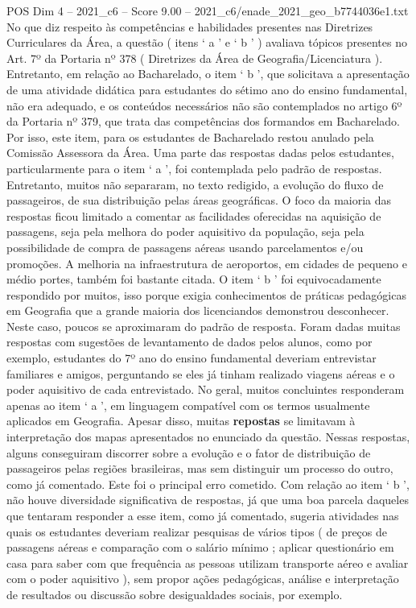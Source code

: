 \begin{textsample}{POS Dim 4 – 2021\_c6 – Score 9.00 – 2021\_c6/enade\_2021\_geo\_b7744036e1.txt}
No que diz respeito às competências e habilidades presentes nas Diretrizes Curriculares da Área, a questão ( itens ‘ a ’ e ‘ b ’ ) avaliava tópicos presentes no Art. 7º da Portaria nº 378 ( Diretrizes da Área de Geografia/Licenciatura ).
Entretanto, em relação ao Bacharelado, o item ‘ b ’, que solicitava a apresentação de uma atividade didática para estudantes do sétimo ano do ensino fundamental, não era adequado, e os conteúdos necessários não são contemplados no artigo 6º da Portaria nº 379, que trata das competências dos formandos em Bacharelado.
Por isso, este item, para os estudantes de Bacharelado restou anulado pela Comissão Assessora da Área.
Uma parte das respostas dadas pelos estudantes, particularmente para o item ‘ a ’, foi contemplada pelo padrão de respostas.
Entretanto, muitos não separaram, no texto redigido, a evolução do fluxo de passageiros, de sua distribuição pelas áreas geográficas.
O foco da maioria das respostas ficou limitado a comentar as facilidades oferecidas na aquisição de passagens, seja pela melhora do poder aquisitivo da população, seja pela possibilidade de compra de passagens aéreas usando parcelamentos e/ou promoções.
A melhoria na infraestrutura de aeroportos, em cidades de pequeno e médio portes, também foi bastante citada.
O item ‘ b ’ foi equivocadamente respondido por muitos, isso porque exigia conhecimentos de práticas pedagógicas em Geografia que a grande maioria dos licenciandos demonstrou desconhecer.
Neste caso, poucos se aproximaram do padrão de resposta.
Foram dadas muitas respostas com sugestões de levantamento de dados pelos alunos, como por exemplo, estudantes do 7º ano do ensino fundamental deveriam entrevistar familiares e amigos, perguntando se eles já tinham realizado viagens aéreas e o poder aquisitivo de cada entrevistado.
No geral, muitos concluintes responderam apenas ao item ‘ a ’, em linguagem compatível com os termos usualmente aplicados em Geografia.
Apesar disso, muitas \textbf{repostas} se limitavam à interpretação dos mapas apresentados no enunciado da questão.
Nessas respostas, alguns conseguiram discorrer sobre a evolução e o fator de distribuição de passageiros pelas regiões brasileiras, mas sem distinguir um processo do outro, como já comentado.
Este foi o principal erro cometido.
Com relação ao item ‘ b ’, não houve diversidade significativa de respostas, já que uma boa parcela daqueles que tentaram responder a esse item, como já comentado, sugeria atividades nas quais os estudantes deveriam realizar pesquisas de vários tipos ( de preços de passagens aéreas e comparação com o salário mínimo ; aplicar questionário em casa para saber com que frequência as pessoas utilizam transporte aéreo e avaliar com o poder aquisitivo ), sem propor ações pedagógicas, análise e interpretação de resultados ou discussão sobre desigualdades sociais, por exemplo.

\end{textsample}
